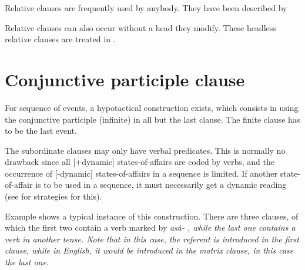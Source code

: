 Relative clauses are frequently used by anybody. They have been described by \citet{Slomanson2007cll}


Relative clauses can also occur without a head they modify. These headless relative clauses are treated in .



\section{Conjunctive participle clause}\label{sec:cls:Conjunctiveparticipleclause}

For sequence of events, a hypotactical construction exists, which consists in using the conjunctive participle (infinite) in all but the last clause.  The finite clause has to be the last event. 


The subordinate clauses may only have verbal predicates. This is normally no drawback since all [+dynamic] states-of-affairs are coded by verbs, and the occurrence of [-dynamic] states-of-affairs in a sequence is limited. If another state-of-affair is to be used in a sequence, it must necessarily get a dynamic reading (see  for strategies for this).

Example  shows a typical instance of this construction. There are three clauses, of which the first two contain a verb marked by \em asà- \em, while the last one contains a verb in another tense. Note that in this case, the referent  is introduced in the first clause, while in English, it would be introduced in the matrix clause, in this case the last one.



